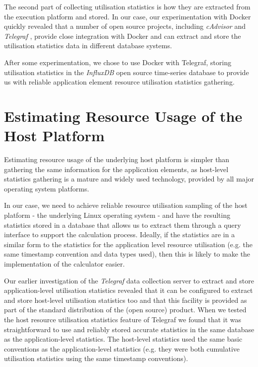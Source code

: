 The second part of collecting utilisation statistics is how they are extracted from the execution platform and stored.  In our case, our experimentation with Docker quickly revealed that a number of open source projects, including \emph{cAdvisor} \cite{cadvisor2018} and \emph{Telegraf} \cite{telegraf2018}, provide close integration with Docker and can extract and store the utilisation statistics data in different database systems.

After some experimentation, we chose to use Docker with Telegraf, storing utilisation statistics in the \emph{InfluxDB} \cite{influxdb2018} open source time-series database to provide us with reliable application element resource utilisation statistics gathering.

\section{Estimating Resource Usage of the Host Platform}

Estimating resource usage of the underlying host platform is simpler than gathering the same information for the application elements, as host-level statistics gathering is a mature and widely used technology, provided by all major operating system platforms.

In our case, we need to achieve reliable resource utilisation sampling of the host platform - the underlying Linux operating system - and have the resulting statistics stored in a database that allows us to extract them through a query interface to support the calculation process.  Ideally, if the statistics are in a similar form to the statistics for the application level resource utilisation (e.g. the same timestamp convention and data types used), then this is likely to make the implementation of the calculator easier.

Our earlier investigation of the \emph{Telegraf} data collection server to extract and store application-level utilisation statistics revealed that it can be configured to extract and store host-level utilisation statistics too and that this facility is provided as part of the standard distribution of the (open source) product.  When we tested the host resource utilisation statistics feature of Telegraf we found that it was straightforward to use and reliably stored accurate statistics in the same database as the application-level statistics.  The host-level statistics used the same basic conventions as the application-level statistics (e.g. they were both cumulative utilisation statistics using the same timestamp conventions).

